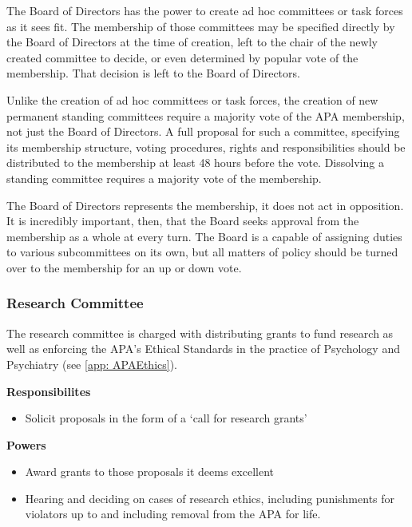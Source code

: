 \begin{refsection}
The Board of Directors has the power to create ad hoc committees or task forces as it sees fit. The membership of those committees may be specified directly by the Board of Directors at the time of creation, left to the chair of the newly created committee to decide, or even determined by popular vote of the membership. That decision is left to the Board of Directors.

Unlike the creation of ad hoc committees or task forces, the creation of new permanent standing committees require a majority vote of the APA membership, not just the Board of Directors. A full proposal for such a committee, specifying its membership structure, voting procedures, rights and responsibilities should be distributed to the membership at least 48 hours before the vote. Dissolving a standing committee requires a majority vote of the membership.

The Board of Directors represents the membership, it does not act in opposition. It is incredibly important, then, that the Board seeks approval from the membership as a whole at every turn. The Board is a capable of assigning duties to various subcommittees on its own, but all matters of policy should be turned over to the membership for an up or down vote.

\newpage

\subsubsection{Research Committee}
\label{researchcommittee}

The research committee is charged with distributing grants to fund research as well as enforcing the APA's Ethical Standards in the practice of Psychology and Psychiatry (see \ref{app: APAEthics}).

\textbf{Responsibilites}

\begin{itemize}
\item Solicit proposals in the form of a `call for research grants'

\end{itemize}

\textbf{Powers} 

\begin{itemize}
\item Award grants to those proposals it deems excellent

\item Hearing and deciding on cases of research ethics, including punishments for violators up to and including removal from the APA for life.


\end{itemize}
\end{refsection}
